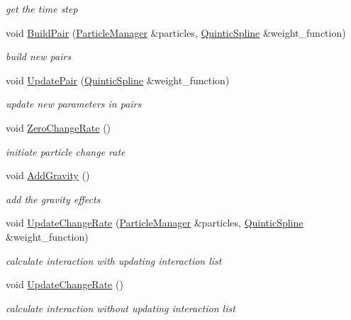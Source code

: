 \begin{CompactItemize}
\begin{CompactList}\small\item\em get the time step \item\end{CompactList}\item 
void \hyperlink{classHydrodynamics_41e1527e65d6f93d81c30467871021f5}{BuildPair} (\hyperlink{classParticleManager}{ParticleManager} \&particles, \hyperlink{classQuinticSpline}{QuinticSpline} \&weight\_\-function)
\begin{CompactList}\small\item\em build new pairs \item\end{CompactList}\item 
void \hyperlink{classHydrodynamics_cf0d749b11e8b8474dd204c6ea080235}{UpdatePair} (\hyperlink{classQuinticSpline}{QuinticSpline} \&weight\_\-function)
\begin{CompactList}\small\item\em update new parameters in pairs \item\end{CompactList}\item 
void \hyperlink{classHydrodynamics_67e2d72d69156a086d43168f5cd58bf7}{ZeroChangeRate} ()
\begin{CompactList}\small\item\em initiate particle change rate \item\end{CompactList}\item 
void \hyperlink{classHydrodynamics_abdebac769f07f2500c21689fafa2981}{AddGravity} ()
\begin{CompactList}\small\item\em add the gravity effects \item\end{CompactList}\item 
void \hyperlink{classHydrodynamics_22df8569d81c4c363029efac143ddb26}{UpdateChangeRate} (\hyperlink{classParticleManager}{ParticleManager} \&particles, \hyperlink{classQuinticSpline}{QuinticSpline} \&weight\_\-function)
\begin{CompactList}\small\item\em calculate interaction with updating interaction list \item\end{CompactList}\item 
void \hyperlink{classHydrodynamics_f744ee07f3f3b511d0db18949160c20a}{UpdateChangeRate} ()
\begin{CompactList}\small\item\em calculate interaction without updating interaction list \item\end{CompactList}\item 

\end{CompactItemize}
